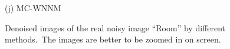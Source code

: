 \documentclass[10pt,onecolumn,letterpaper]{article}
\begin{document}
\begin{figure}[!htbp]
{\begin{minipage}[t]{0.3\textwidth}
{\footnotesize (j) MC-WNNM  }
\end{minipage}
}
\vspace{-1mm}
\caption{Denoised images of the real noisy image ``Room'' \cite{ncwebsite} by different methods.\ The images are better to be zoomed in on screen.}
\label{f10}
\end{figure}



\begin{figure}[!htbp]
\centering
{}
\end{figure}
\end{document}
